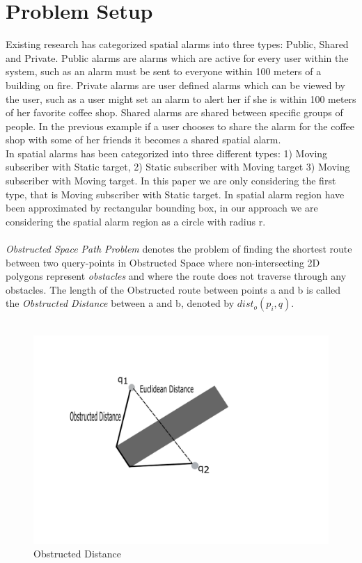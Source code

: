 \section{Problem Setup}
Existing research has categorized spatial alarms into three types: Public, Shared and Private. Public alarms are alarms which are active for every user within the system, such as an alarm must be sent to everyone within 100 meters of a building on fire. Private alarms are user defined alarms which can be viewed by the user, such as a user might set an alarm to alert her if she is within 100 meters of her favorite coffee shop. Shared alarms are shared between specific groups of people. In the previous example if a user chooses to share the alarm for the coffee shop with some of her friends it becomes a shared spatial alarm.\\
In \cite{bamba}  spatial alarms has been categorized into three different types: 1) Moving subscriber with Static target, 2) Static subscriber with Moving target 3) Moving subscriber with Moving target. In this paper we are only considering the first type, that is Moving subscriber with Static target. 
In \cite{mur} spatial alarm region have been approximated by rectangular bounding box, in our approach we are considering the spatial alarm region as a circle with radius r.\\ \\
\textit{Obstructed Space Path Problem} \cite{ognn} denotes the problem of finding the shortest route between two query-points  in Obstructed Space where non-intersecting 2D polygons represent \textit{obstacles} and where the route does not traverse through any obstacles. The length of the Obstructed route between points a and b is called the \textit{Obstructed Distance} between a and b, denoted by $dist_o(p_i,q)$.\\ \\

\begin{figure}[h]
  \includegraphics[width=\linewidth]{obstructed_distance.png}
  \caption{Obstructed Distance}
  \label{fig:odist}
\end{figure}



